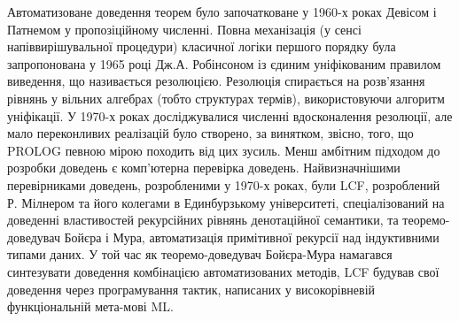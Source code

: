 \documentclass{article}
\begin{document}
Автоматизоване доведення теорем було започатковане у 1960-х роках Девісом і Патнемом у пропозіційному численні. Повна механізація (у сенсі напіввирішувальної процедури) класичної логіки першого порядку була запропонована у 1965 році Дж.А. Робінсоном із єдиним уніфікованим правилом виведення, що називається резолюцією. Резолюція спирається на розв’язання рівнянь у вільних алгебрах (тобто структурах термів), використовуючи алгоритм уніфікації. У 1970-х роках досліджувалися численні вдосконалення резолюції, але мало переконливих реалізацій було створено, за винятком, звісно, того, що PROLOG певною мірою походить від цих зусиль. Менш амбітним підходом до розробки доведень є комп’ютерна перевірка доведень. Найвизначнішими перевірниками доведень, розробленими у 1970-х роках, були LCF, розроблений Р. Мілнером та його колегами в Единбурзькому університеті, спеціалізований на доведенні властивостей рекурсійних рівнянь денотаційної семантики, та теоремо-доведувач Бойєра і Мура, автоматизація примітивної рекурсії над індуктивними типами даних. У той час як теоремо-доведувач Бойєра-Мура намагався синтезувати доведення комбінацією автоматизованих методів, LCF будував свої доведення через програмування тактик, написаних у високорівневій функціональній мета-мові ML.
\end{document}
